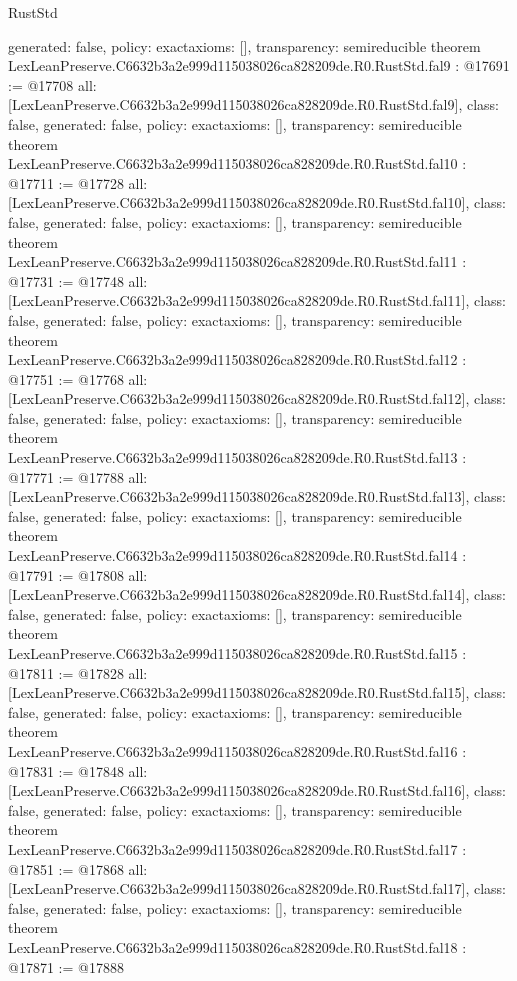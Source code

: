 \begin{lexlean}{RustStd}
\begin{coremodule}
{  generated: false,
  policy: exact{axioms: []},
  transparency: semireducible
}
theorem LexLeanPreserve.C6632b3a2e999d115038026ca828209de.R0.RustStd.fal9 : @17691 := @17708 {
  all: [LexLeanPreserve.C6632b3a2e999d115038026ca828209de.R0.RustStd.fal9],
  class: false,
  generated: false,
  policy: exact{axioms: []},
  transparency: semireducible
}
theorem LexLeanPreserve.C6632b3a2e999d115038026ca828209de.R0.RustStd.fal10 : @17711 := @17728 {
  all: [LexLeanPreserve.C6632b3a2e999d115038026ca828209de.R0.RustStd.fal10],
  class: false,
  generated: false,
  policy: exact{axioms: []},
  transparency: semireducible
}
theorem LexLeanPreserve.C6632b3a2e999d115038026ca828209de.R0.RustStd.fal11 : @17731 := @17748 {
  all: [LexLeanPreserve.C6632b3a2e999d115038026ca828209de.R0.RustStd.fal11],
  class: false,
  generated: false,
  policy: exact{axioms: []},
  transparency: semireducible
}
theorem LexLeanPreserve.C6632b3a2e999d115038026ca828209de.R0.RustStd.fal12 : @17751 := @17768 {
  all: [LexLeanPreserve.C6632b3a2e999d115038026ca828209de.R0.RustStd.fal12],
  class: false,
  generated: false,
  policy: exact{axioms: []},
  transparency: semireducible
}
theorem LexLeanPreserve.C6632b3a2e999d115038026ca828209de.R0.RustStd.fal13 : @17771 := @17788 {
  all: [LexLeanPreserve.C6632b3a2e999d115038026ca828209de.R0.RustStd.fal13],
  class: false,
  generated: false,
  policy: exact{axioms: []},
  transparency: semireducible
}
theorem LexLeanPreserve.C6632b3a2e999d115038026ca828209de.R0.RustStd.fal14 : @17791 := @17808 {
  all: [LexLeanPreserve.C6632b3a2e999d115038026ca828209de.R0.RustStd.fal14],
  class: false,
  generated: false,
  policy: exact{axioms: []},
  transparency: semireducible
}
theorem LexLeanPreserve.C6632b3a2e999d115038026ca828209de.R0.RustStd.fal15 : @17811 := @17828 {
  all: [LexLeanPreserve.C6632b3a2e999d115038026ca828209de.R0.RustStd.fal15],
  class: false,
  generated: false,
  policy: exact{axioms: []},
  transparency: semireducible
}
theorem LexLeanPreserve.C6632b3a2e999d115038026ca828209de.R0.RustStd.fal16 : @17831 := @17848 {
  all: [LexLeanPreserve.C6632b3a2e999d115038026ca828209de.R0.RustStd.fal16],
  class: false,
  generated: false,
  policy: exact{axioms: []},
  transparency: semireducible
}
theorem LexLeanPreserve.C6632b3a2e999d115038026ca828209de.R0.RustStd.fal17 : @17851 := @17868 {
  all: [LexLeanPreserve.C6632b3a2e999d115038026ca828209de.R0.RustStd.fal17],
  class: false,
  generated: false,
  policy: exact{axioms: []},
  transparency: semireducible
}
theorem LexLeanPreserve.C6632b3a2e999d115038026ca828209de.R0.RustStd.fal18 : @17871 := @17888 {
}
\end{coremodule}
\end{lexlean}
